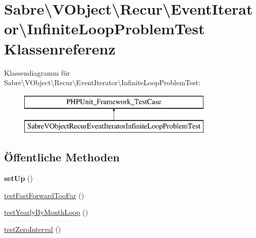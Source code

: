 \hypertarget{class_sabre_1_1_v_object_1_1_recur_1_1_event_iterator_1_1_infinite_loop_problem_test}{}\section{Sabre\textbackslash{}V\+Object\textbackslash{}Recur\textbackslash{}Event\+Iterator\textbackslash{}Infinite\+Loop\+Problem\+Test Klassenreferenz}
\label{class_sabre_1_1_v_object_1_1_recur_1_1_event_iterator_1_1_infinite_loop_problem_test}
Klassendiagramm für Sabre\textbackslash{}V\+Object\textbackslash{}Recur\textbackslash{}Event\+Iterator\textbackslash{}Infinite\+Loop\+Problem\+Test\+:\begin{figure}[H]
\begin{center}
\leavevmode
\includegraphics[height=2.000000cm]{class_sabre_1_1_v_object_1_1_recur_1_1_event_iterator_1_1_infinite_loop_problem_test}
\end{center}
\end{figure}
\subsection*{Öffentliche Methoden}
\begin{DoxyCompactItemize}
\item 
\mbox{\label{class_sabre_1_1_v_object_1_1_recur_1_1_event_iterator_1_1_infinite_loop_problem_test_a571c3fd02cb21a9d8146e3a6712c30e3}} 
{\bfseries set\+Up} ()
\item 
\mbox{\hyperlink{class_sabre_1_1_v_object_1_1_recur_1_1_event_iterator_1_1_infinite_loop_problem_test_a98d9c0abd7d4a9c64611ca7a26efc9b9}{test\+Fast\+Forward\+Too\+Far}} ()
\item 
\mbox{\hyperlink{class_sabre_1_1_v_object_1_1_recur_1_1_event_iterator_1_1_infinite_loop_problem_test_a8f917b37613b9b71b19bdd5e55aa7bb8}{test\+Yearly\+By\+Month\+Loop}} ()
\item 
\mbox{\hyperlink{class_sabre_1_1_v_object_1_1_recur_1_1_event_iterator_1_1_infinite_loop_problem_test_aa7464632a9bae573989a8af3caacf0b4}{test\+Zero\+Interval}} ()
\end{DoxyCompactItemize}


